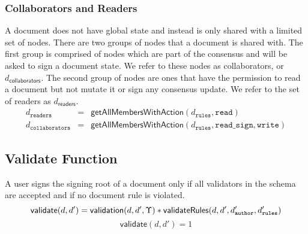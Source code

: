 \subsubsection{Collaborators and Readers}
A document does not have global state and instead is only shared with a limited set of nodes. There are two groups of nodes that a document is shared with. The first group is comprised of nodes which are part of the consensus and will be asked to sign a document state. We refer to these nodes as collaborators, or $d_{\mathsf{collaborators}}$. The second group of nodes are ones that have the permission to read a document but not mutate it or sign any consensus update. We refer to the set of readers as $d_{\mathsf{readers}}$.\\
\begin{eqnarray}
d_{\mathtt{readers}} & = & \mathsf{getAllMembersWithAction}( d_\mathtt{rules} ,\mathtt{read}) \\
d_{\mathtt{collaborators}} &  = & \mathsf{getAllMembersWithAction}( d_\mathtt{rules} ,\mathtt{read\_sign,write}) 
\end{eqnarray}
\subsection{Validate Function}
A user signs the signing root of a document only if all validators in the schema are accepted and if no document rule is violated.
\begin{equation}
 \mathsf{validate}(d,d') =\mathsf{validation}(d,d',\Upsilon) * \mathsf{validateRules}(d,d',d'_{\mathtt{author}},d'_{\mathtt{rules}}) \\
 \end{equation}
    \begin{equation}
 \mathsf{validate}(d,d') = 1
 \end{equation}

